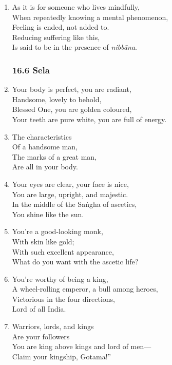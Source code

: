 \documentclass[10pt, openany]{book}
\newcommand*{\vleftofline}[1]{\leavevmode\llap{#1}}
\begin{document}
\begin{enumerate}
\item As it is for someone who lives mindfully,\\
When repeatedly knowing a mental phenomenon,\\
Feeling is ended, not added to.\\
Reducing suffering like this,\\
Is said to be in the presence of \emph{nibbāna}.

\subsubsection*{16.6 Sela}

\item \vleftofline{“}Your body is perfect, you are radiant,\\
Handsome, lovely to behold,\\
Blessed One, you are golden coloured,\\
Your teeth are pure white, you are full of energy.

\item The characteristics\\
Of a handsome man,\\
The marks of a great man,\\
Are all in your body.

\item Your eyes are clear, your face is nice,\\
You are large, upright, and majestic.\\
In the middle of the Saṅgha of ascetics,\\
You shine like the sun.

\item You’re a good-looking monk,\\
With skin like gold;\\
With such excellent appearance,\\
What do you want with the ascetic life?

\item You’re worthy of being a king,\\
A wheel-rolling emperor, a bull among heroes,\\
Victorious in the four directions,\\
Lord of all India.

\item Warriors, lords, and kings\\
Are your followers\\
You are king above kings and lord of men—\\
Claim your kingship, Gotama!”


\end{enumerate}
\end{document}
